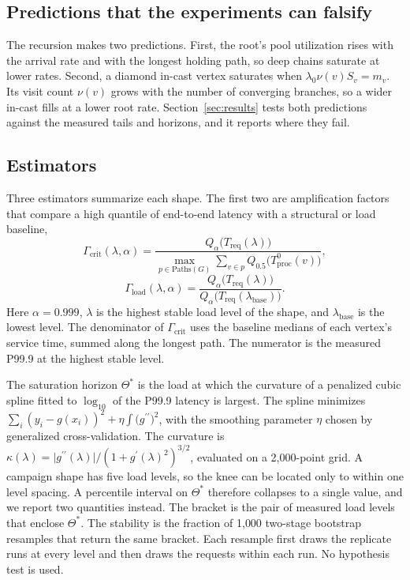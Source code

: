 \subsection{Predictions that the experiments can falsify}

The recursion makes two predictions. First, the root's pool utilization rises with the arrival rate and with the longest holding path, so deep chains saturate at lower rates. Second, a diamond in-cast vertex saturates when $\lambda_0\nu(v)S_v=m_v$. Its visit count $\nu(v)$ grows with the number of converging branches, so a wider in-cast fills at a lower root rate. Section~\ref{sec:results} tests both predictions against the measured tails and horizons, and it reports where they fail.

\subsection{Estimators}
\label{sec:estimators}

Three estimators summarize each shape. The first two are amplification factors that compare a high quantile of end-to-end latency with a structural or load baseline,
\begin{equation}
  \Gamma_{\mathrm{crit}}(\lambda,\alpha)=\frac{Q_\alpha\bigl(T_{\mathrm{req}}(\lambda)\bigr)}{\max_{p\in\mathrm{Paths}(G)}\sum_{v\in p}Q_{0.5}\bigl(T^0_{\mathrm{proc}}(v)\bigr)},
  \label{eq:gcrit}
\end{equation}
\begin{equation}
  \Gamma_{\mathrm{load}}(\lambda,\alpha)=\frac{Q_\alpha\bigl(T_{\mathrm{req}}(\lambda)\bigr)}{Q_\alpha\bigl(T_{\mathrm{req}}(\lambda_{\mathrm{base}})\bigr)}.
  \label{eq:gload}
\end{equation}
Here $\alpha=0.999$, $\lambda$ is the highest stable load level of the shape, and $\lambda_{\mathrm{base}}$ is the lowest level. The denominator of $\Gamma_{\mathrm{crit}}$ uses the baseline medians of each vertex's service time, summed along the longest path. The numerator is the measured P99.9 at the highest stable level.

The saturation horizon $\Theta^*$ is the load at which the curvature of a penalized cubic spline fitted to $\log_{10}$ of the P99.9 latency is largest. The spline minimizes $\sum_i(y_i-g(x_i))^2+\eta\int \bigl(g^{\prime\prime}\bigr)^2$, with the smoothing parameter $\eta$ chosen by generalized cross-validation. The curvature is $\kappa(\lambda)=\lvert g^{\prime\prime}(\lambda)\rvert/(1+g^{\prime}(\lambda)^2)^{3/2}$, evaluated on a 2{,}000-point grid. A campaign shape has five load levels, so the knee can be located only to within one level spacing. A percentile interval on $\Theta^*$ therefore collapses to a single value, and we report two quantities instead. The bracket is the pair of measured load levels that enclose $\Theta^*$. The stability is the fraction of 1{,}000 two-stage bootstrap resamples that return the same bracket. Each resample first draws the replicate runs at every level and then draws the requests within each run. No hypothesis test is used.

